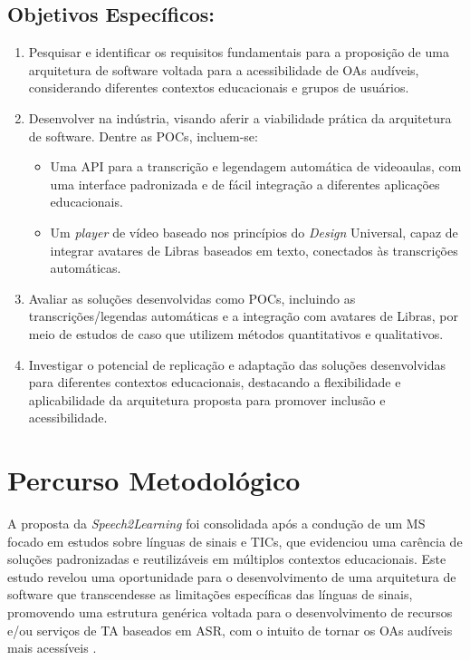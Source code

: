 \subsection*{Objetivos Específicos:}

\begin{enumerate}
\item Pesquisar e identificar os requisitos fundamentais para a proposição de uma arquitetura de software voltada para a acessibilidade de OAs audíveis, considerando diferentes contextos educacionais e grupos de usuários.
\item Desenvolver  na indústria, visando aferir a viabilidade prática da arquitetura de software. Dentre as POCs, incluem-se:
\begin{itemize}
\item Uma API para a transcrição e legendagem automática de videoaulas, com uma interface padronizada e de fácil integração a diferentes aplicações educacionais.
\item Um \textit{player} de vídeo baseado nos princípios do \textit{Design} Universal, capaz de integrar avatares de Libras baseados em texto, conectados às transcrições automáticas.
\end{itemize}
\item Avaliar as soluções desenvolvidas como POCs, incluindo as transcrições/legendas automáticas e a integração com avatares de Libras, por meio de estudos de caso que utilizem métodos quantitativos e qualitativos.
\item Investigar o potencial de replicação e adaptação das soluções desenvolvidas para diferentes contextos educacionais, destacando a flexibilidade e aplicabilidade da arquitetura proposta para promover inclusão e acessibilidade.
\end{enumerate}

\section{Percurso Metodológico}

A proposta da \textit{Speech2Learning} foi consolidada após a condução de um MS focado em estudos sobre línguas de sinais e TICs, que evidenciou uma carência de soluções padronizadas e reutilizáveis em múltiplos contextos educacionais. Este estudo revelou uma oportunidade para o desenvolvimento de uma arquitetura de software que transcendesse as limitações específicas das línguas de sinais, promovendo uma estrutura genérica voltada para o desenvolvimento de recursos e/ou serviços de TA baseados em ASR, com o intuito de tornar os OAs audíveis mais acessíveis \cite{FalvoJr2020_FIE, FalvoJr2020_SBIE, FalvoJr2021_RENOTE}.

